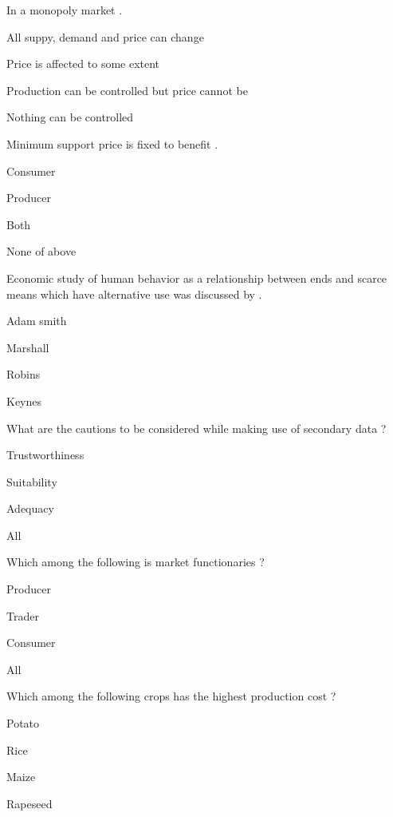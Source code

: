 \begin{questions}
\question In a monopoly market \fillin[][3cm].
\begin{items}
\item* All suppy, demand and price can change
\item Price is affected to some extent
\item Production can be controlled but price cannot be
\item Nothing can be controlled
\end{items}

\question Minimum support price is fixed to benefit \fillin[][3cm].
\begin{items}
\item Consumer
\item* Producer
\item Both
\item None of above
\end{items}

\question Economic study of human behavior as a relationship between ends and scarce means which have alternative use was discussed by \fillin[][3cm].
\begin{items}
\item Adam smith
\item Marshall
\item* Robins
\item Keynes
\end{items}

\question What are the cautions to be considered while making use of secondary data ?
\begin{items}
\item Trustworthiness
\item Suitability
\item Adequacy
\item* All
\end{items}

\question Which among the following is market functionaries ?
\begin{items}
\item Producer
\item Trader
\item Consumer
\item* All
\end{items}

\question Which among the following crops has the highest production cost ?
\begin{items}
\item Potato
\item* Rice
\item Maize
\item Rapeseed
\end{items}


\end{questions}
